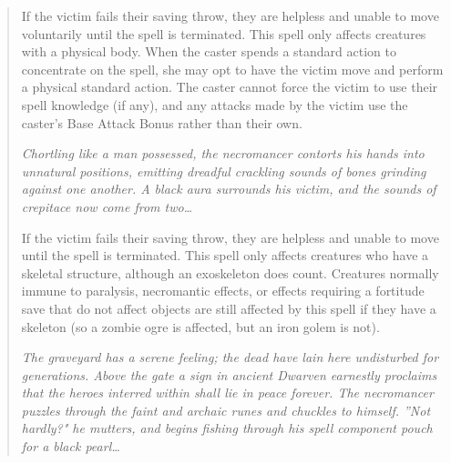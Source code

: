 \begin{quote}
If the victim fails their saving throw, they are helpless and unable to move voluntarily until the spell is terminated. This spell only affects creatures with a physical body. When the caster spends a standard action to concentrate on the spell, she may opt to have the victim move and perform a physical standard action. The caster cannot force the victim to use their spell knowledge (if any), and any attacks made by the victim use the caster's Base Attack Bonus rather than their own.\\

\begin{small}
\end{small}
\emph{Chortling like a man possessed, the necromancer contorts his hands into unnatural positions, emitting dreadful crackling sounds of bones grinding against one another. A black aura surrounds his victim, and the sounds of crepitace now come from two\ldots}

If the victim fails their saving throw, they are helpless and unable to move until the spell is terminated. This spell only affects creatures who have a skeletal structure, although an exoskeleton does count. Creatures normally immune to paralysis, necromantic effects, or effects requiring a fortitude save that do not affect objects are still affected by this spell if they have a skeleton (so a zombie ogre is affected, but an iron golem is not).\\

\begin{small}
\end{small}
\emph{The graveyard has a serene feeling; the dead have lain here undisturbed for generations. Above the gate a sign in ancient Dwarven earnestly proclaims that the heroes interred within shall lie in peace forever. The necromancer puzzles through the faint and archaic runes and chuckles to himself. ''Not hardly?" he mutters, and begins fishing through his spell component pouch for a black pearl\ldots}


\end{quote}
